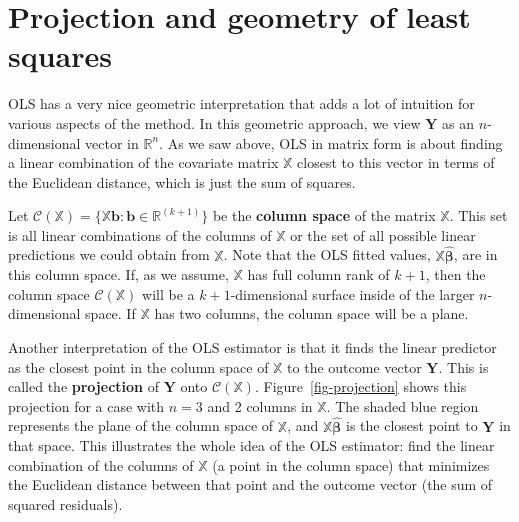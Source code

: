 \documentclass[
  letterpaper,
  DIV=11,
  numbers=noendperiod]{scrreprt}
\newcommand{\mb}{\symbf}
\newcommand{\Xmat}{\mathbb{X}}
\newcommand{\bhat}{\widehat{\mb{\beta}}}
\theoremstyle{plain}
\theoremstyle{definition}
\theoremstyle{definition}
\theoremstyle{remark}
\begin{document}
\hypertarget{projection-and-geometry-of-least-squares}{%
\section{Projection and geometry of least
squares}\label{projection-and-geometry-of-least-squares}}

OLS has a very nice geometric interpretation that adds a lot of
intuition for various aspects of the method. In this geometric approach,
we view \(\mb{Y}\) as an \(n\)-dimensional vector in \(\mathbb{R}^n\).
As we saw above, OLS in matrix form is about finding a linear
combination of the covariate matrix \(\Xmat\) closest to this vector in
terms of the Euclidean distance, which is just the sum of squares.

Let
\(\mathcal{C}(\Xmat) = \{\Xmat\mb{b} : \mb{b} \in \mathbb{R}^(k+1)\}\)
be the \textbf{column space} of the matrix \(\Xmat\). This set is all
linear combinations of the columns of \(\Xmat\) or the set of all
possible linear predictions we could obtain from \(\Xmat\). Note that
the OLS fitted values, \(\Xmat\bhat\), are in this column space. If, as
we assume, \(\Xmat\) has full column rank of \(k+1\), then the column
space \(\mathcal{C}(\Xmat)\) will be a \(k+1\)-dimensional surface
inside of the larger \(n\)-dimensional space. If \(\Xmat\) has two
columns, the column space will be a plane.

Another interpretation of the OLS estimator is that it finds the linear
predictor as the closest point in the column space of \(\Xmat\) to the
outcome vector \(\mb{Y}\). This is called the \textbf{projection} of
\(\mb{Y}\) onto \(\mathcal{C}(\Xmat)\). Figure~\ref{fig-projection}
shows this projection for a case with \(n=3\) and 2 columns in
\(\Xmat\). The shaded blue region represents the plane of the column
space of \(\Xmat\), and \(\Xmat\bhat\) is the closest point to
\(\mb{Y}\) in that space. This illustrates the whole idea of the OLS
estimator: find the linear combination of the columns of \(\Xmat\) (a
point in the column space) that minimizes the Euclidean distance between
that point and the outcome vector (the sum of squared residuals).
\end{document}
